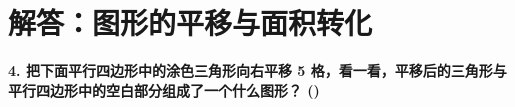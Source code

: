 



\newpage

\section{解答：图形的平移与面积转化}

\vspace{0.4cm}

\noindent\textbf{4. 把下面平行四边形中的涂色三角形向右平移 5 格，看一看，平移后的三角形与平行四边形中的空白部分组成了一个什么图形？ ()}

\vspace{0.8cm}

